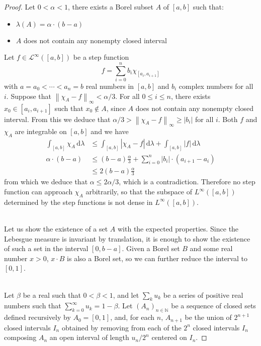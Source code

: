 \documentclass[11pt,a4paper,twoside]{article}
\theoremstyle{definition}
\theoremstyle{plain}
\begin{document}
\begin{proof}

  Let $0 < \alpha < 1$, there exists a Borel subset $A$ of $[ a, b ]$ such that:
  \begin{itemize}
  \item $\lambda \left( A \right) = \alpha \cdot ( b - a )$
  \item $A$ does not contain any nonempty closed interval
  \end{itemize}
  Let $f \in \mathscr{L}^\infty ( [ a, b ] )$ be a step function
  \begin{equation*}
    f = \sum_{i = 0}^n b_i \chi_{[ a_i, a_{i + 1} ]}
  \end{equation*}
  with $a = a_0 < \dotsb < a_n = b$ real numbers in $[ a, b ]$ and $b_i$ complex numbers for all $i$.
  Suppose that $\left\| \chi_A - f \right\|_\infty < \alpha / 3$. For all $0 \leq i \leq n$,
  there exists $x_0 \in [ a_i, a_{i + 1} ]$ such that $x_0 \notin A$, since $A$ does not contain any nonempty closed interval.
  From this we deduce that $\alpha / 3 > \left\| \chi_A - f \right\|_\infty \geq | b_i |$ for all $i$.
  Both $f$ and $\chi_A$ are integrable on $[ a, b ]$ and we have
  \begin{align*}
    \int_{[ a, b ]} \chi_A \,\mathrm{d}\lambda &\leq \int_{[ a, b ]} | \chi_A - f | \,\mathrm{d}\lambda + \int_{[ a, b ]} | f | \,\mathrm{d}\lambda \\
    \alpha \cdot ( b - a )&\leq ( b - a ) \frac{\alpha}{3} + \sum_{i = 0}^n | b_i | \cdot ( a_{i + 1} - a_i ) \\
    &\leq 2 ( b - a ) \frac{\alpha}{3}
  \end{align*}
  from which we deduce that $\alpha \leq 2 \alpha / 3$, which is a contradiction.
  Therefore no step function can approach $\chi_A$ arbitrarily, so that the subspace of $L^\infty ( [ a, b ] )$ determined by the step functions
  is not dense in $L^\infty ( [ a, b ] )$.

  ~\\
  Let us show the existence of a set $A$ with the expected properties. Since the Lebesgue measure is invariant by translation,
  it is enough to show the existence of such a set in the interval $[ 0, b - a ]$. Given a Borel set $B$ and some real number $x > 0$,
  $x \cdot B$ is also a Borel set, so we can further reduce the interval to $[ 0, 1 ]$.

  ~\\
  Let $\beta$ be a real such that $0 < \beta < 1$, and let $\sum_k u_k$ be a series of positive real numbers such that $\sum_{k = 0}^\infty u_k = 1 - \beta$.
  Let $( A_n )_{n \in \mathbb{N}}$ be a sequence of closed sets defined recursively by $A_0 = [ 0, 1 ]$, and, for each $n$,
  $A_{n + 1}$ be the union of $2^{n + 1}$ closed intervals $I_n$ obtained by removing from each of the $2^n$ closed intervals $I_n$ composing $A_n$
  an open interval of length $u_n / 2^n$ centered on $I_n$.


\end{proof}
\end{document}
